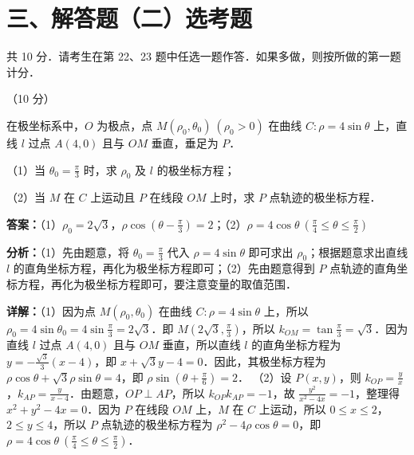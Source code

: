 \section*{三、解答题（二）选考题}
共 10 分．请考生在第 22、23 题中任选一题作答．如果多做，则按所做的第一题计分．

\begin{question}[points=10]
[选修 4-4：坐标系与参数方程]（10 分）

在极坐标系中，$O$ 为极点，点 $M(\rho_0,\theta_0)\ (\rho_0>0)$ 在曲线 $C:\rho=4\sin\theta$ 上，直线 $l$ 过点 $A(4,0)$ 且与 $OM$ 垂直，垂足为 $P$．

（1）当 $\theta_0=\frac{\pi}{3}$ 时，求 $\rho_0$ 及 $l$ 的极坐标方程；

（2）当 $M$ 在 $C$ 上运动且 $P$ 在线段 $OM$ 上时，求 $P$ 点轨迹的极坐标方程．
\begin{solution}
\textbf{答案：}（1）$\rho_0=2\sqrt{3}$，$\rho\cos(\theta-\frac{\pi}{3})=2$；（2）$\rho=4\cos\theta\ (\frac{\pi}{4}\leq\theta\leq\frac{\pi}{2})$

\textbf{分析：}（1）先由题意，将 $\theta_0=\frac{\pi}{3}$ 代入 $\rho=4\sin\theta$ 即可求出 $\rho_0$；根据题意求出直线 $l$ 的直角坐标方程，再化为极坐标方程即可；（2）先由题意得到 $P$ 点轨迹的直角坐标方程，再化为极坐标方程即可，要注意变量的取值范围．

\textbf{详解：}（1）因为点 $M(\rho_0,\theta_0)$ 在曲线 $C:\rho=4\sin\theta$ 上，所以 $\rho_0=4\sin\theta_0=4\sin\frac{\pi}{3}=2\sqrt{3}$．即 $M(2\sqrt{3},\frac{\pi}{3})$，所以 $k_{OM}=\tan\frac{\pi}{3}=\sqrt{3}$．因为直线 $l$ 过点 $A(4,0)$ 且与 $OM$ 垂直，所以直线 $l$ 的直角坐标方程为 $y=-\frac{\sqrt{3}}{3}(x-4)$，即 $x+\sqrt{3}y-4=0$．因此，其极坐标方程为 $\rho\cos\theta+\sqrt{3}\rho\sin\theta=4$，即 $\rho\sin(\theta+\frac{\pi}{6})=2$．
（2）设 $P(x,y)$，则 $k_{OP}=\frac{y}{x}$，$k_{AP}=\frac{y}{x-4}$．由题意，$OP\perp AP$，所以 $k_{OP}k_{AP}=-1$，故 $\frac{y^2}{x^2-4x}=-1$，整理得 $x^2+y^2-4x=0$．因为 $P$ 在线段 $OM$ 上，$M$ 在 $C$ 上运动，所以 $0\leq x\leq 2$，$2\leq y\leq 4$，所以 $P$ 点轨迹的极坐标方程为 $\rho^2-4\rho\cos\theta=0$，即 $\rho=4\cos\theta\ (\frac{\pi}{4}\leq\theta\leq\frac{\pi}{2})$．
\end{solution}
\end{question}

